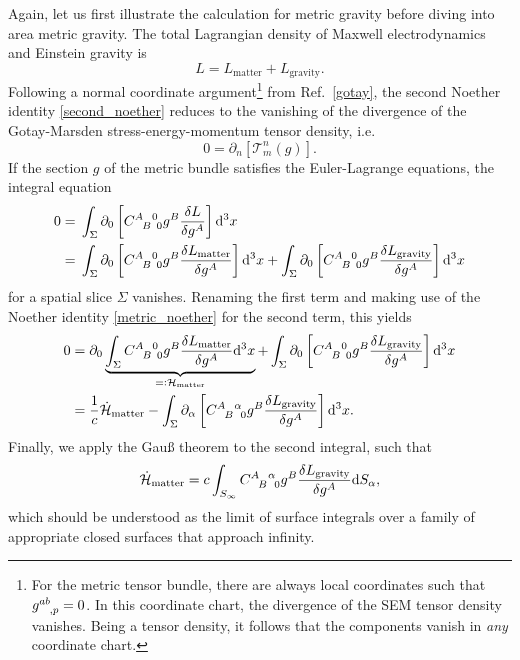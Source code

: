 Again, let us first illustrate the calculation for metric gravity before diving into area metric gravity. The total Lagrangian density of Maxwell electrodynamics and Einstein gravity is
\begin{equation}\label{metric_noether}
  L = L_\text{matter} + L_\text{gravity}.
\end{equation}
Following a normal coordinate argument\footnote{For the metric tensor bundle, there are always local coordinates such that $g^{ab}_{\hphantom{ab},p}=0$. In this coordinate chart, the divergence of the SEM tensor density vanishes. Being a tensor density, it follows that the components vanish in \emph{any} coordinate chart.} from Ref.~\ref{gotay}, the second Noether identity \eqref{second_noether} reduces to the vanishing of the divergence of the Gotay-Marsden stress-energy-momentum tensor density, i.e.~
\begin{equation}
  0 = \partial_n\left\lbrack\mathcal  T^n_m(g)\right\rbrack.
\end{equation}
If the section $g$ of the metric bundle satisfies the Euler-Lagrange equations, the integral equation
\begin{equation}
  \begin{aligned}
    0 = {} & \int_\Sigma \partial_0\left\lbrack \gmc{A}{B}{0}{0} g^B \frac{\delta L}{\delta g^A}\right\rbrack\mathrm d^3x \\
    = {} & \int_\Sigma \partial_0\left\lbrack \gmc{A}{B}{0}{0} g^B \frac{\delta L_\text{matter}}{\delta g^A}\right\rbrack\mathrm d^3x + \int_\Sigma \partial_0\left\lbrack \gmc{A}{B}{0}{0} g^B \frac{\delta L_\text{gravity}}{\delta g^A}\right\rbrack\mathrm d^3x
  \end{aligned}
\end{equation}
for a spatial slice $\Sigma$ vanishes. Renaming the first term and making use of the Noether identity \eqref{metric_noether} for the second term, this yields
\begin{equation}
  \begin{aligned}
    0 = {} & \partial_0 \underbrace{\int_\Sigma \gmc{A}{B}{0}{0} g^B \frac{\delta L_\text{matter}}{\delta g^A}\mathrm d^3x}_{=\vcentcolon \mathcal H_\text{matter}} + \int_\Sigma \partial_0\left\lbrack \gmc{A}{B}{0}{0} g^B \frac{\delta L_\text{gravity}}{\delta g^A}\right\rbrack\mathrm d^3x \\
    = {} & \frac{1}{c} \dot{\mathcal H}_\text{matter} - \int_\Sigma \partial_\alpha\left\lbrack \gmc{A}{B}{\alpha}{0} g^B \frac{\delta L_\text{gravity}}{\delta g^A}\right\rbrack\mathrm d^3x.
  \end{aligned}
\end{equation}
Finally, we apply the Gauß theorem to the second integral, such that
\begin{equation}\label{first_balance_equation}
  \dot{\mathcal H}_\text{matter} = c \int_{S_\infty} \gmc{A}{B}{\alpha}{0} g^B \frac{\delta L_\text{gravity}}{\delta g^A} \mathrm dS_\alpha,
\end{equation}
which should be understood as the limit of surface integrals over a family of appropriate closed surfaces that approach infinity.

